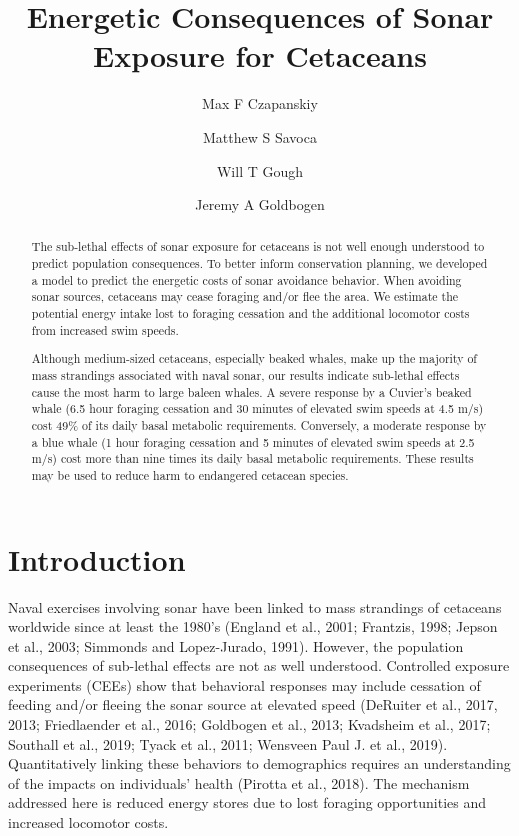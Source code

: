 \documentclass[]{elsarticle} %
\begin{document}
\begin{frontmatter}

  \title{Energetic Consequences of Sonar Exposure for Cetaceans}
    \author[1]{Max F Czapanskiy}
    \author[1]{Matthew S Savoca}
  
  
    \author[1]{Will T Gough}
  
  
    \author[1]{Jeremy A Goldbogen}
  
  
      \address[1]{Department of Biology, Hopkins Marine Station, Stanford University, 120
Ocean View Boulevard, Pacific Grove, CA 93950, USA}
  
  \begin{abstract}
  The sub-lethal effects of sonar exposure for cetaceans is not well
  enough understood to predict population consequences. To better inform
  conservation planning, we developed a model to predict the energetic
  costs of sonar avoidance behavior. When avoiding sonar sources,
  cetaceans may cease foraging and/or flee the area. We estimate the
  potential energy intake lost to foraging cessation and the additional
  locomotor costs from increased swim speeds.
  
  Although medium-sized cetaceans, especially beaked whales, make up the
  majority of mass strandings associated with naval sonar, our results
  indicate sub-lethal effects cause the most harm to large baleen whales.
  A severe response by a Cuvier's beaked whale (6.5 hour foraging
  cessation and 30 minutes of elevated swim speeds at 4.5 m/s) cost 49\%
  of its daily basal metabolic requirements. Conversely, a moderate
  response by a blue whale (1 hour foraging cessation and 5 minutes of
  elevated swim speeds at 2.5 m/s) cost more than nine times its daily
  basal metabolic requirements. These results may be used to reduce harm
  to endangered cetacean species.
  \end{abstract}
  
 \end{frontmatter}

\doublespacing
\linenumbers

\section{Introduction}\label{introduction}

Naval exercises involving sonar have been linked to mass strandings of
cetaceans worldwide since at least the 1980's (England et al., 2001;
Frantzis, 1998; Jepson et al., 2003; Simmonds and Lopez-Jurado, 1991).
However, the population consequences of sub-lethal effects are not as
well understood. Controlled exposure experiments (CEEs) show that
behavioral responses may include cessation of feeding and/or fleeing the
sonar source at elevated speed (DeRuiter et al., 2017, 2013;
Friedlaender et al., 2016; Goldbogen et al., 2013; Kvadsheim et al.,
2017; Southall et al., 2019; Tyack et al., 2011; Wensveen Paul J. et
al., 2019). Quantitatively linking these behaviors to demographics
requires an understanding of the impacts on individuals' health (Pirotta
et al., 2018). The mechanism addressed here is reduced energy stores due
to lost foraging opportunities and increased locomotor costs.
\end{document}
